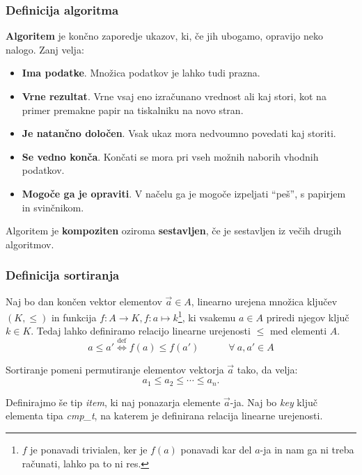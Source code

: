 \documentclass[a4paper,oneside,12pt]{article}
\begin{document}
\subsubsection{Definicija algoritma}

\textbf{Algoritem} je končno zaporedje ukazov, ki, če jih ubogamo, opravijo neko nalogo.
Zanj velja:
\begin{itemize}
  \item \textbf{Ima podatke}. Množica podatkov je lahko tudi prazna.
  \item \textbf{Vrne rezultat}. Vrne vsaj eno izračunano vrednost ali kaj stori, kot na primer
    premakne papir na tiskalniku na novo stran.
  \item \textbf{Je natančno določen}. Vsak ukaz mora nedvoumno povedati kaj storiti.
  \item \textbf{Se vedno konča}. Končati se mora pri vseh možnih naborih vhodnih podatkov.
  \item \textbf{Mogoče ga je opraviti}. V načelu ga je mogoče izpeljati ``peš'', s papirjem in
    svinčnikom.
\end{itemize}

\begin{definicija}
  Algoritem je \textbf{kompoziten} oziroma \textbf{sestavljen}, če je sestavljen iz večih
  drugih algoritmov.
\end{definicija}


\subsubsection{Definicija sortiranja}
\label{chapter:sortdef}
Naj bo dan končen vektor elementov $\vec{a} \in A$, linearno urejena množica ključev $(K,
\leq)$ in funkcija $f\!\!: A \rightarrow K, f\!\!: a \mapsto k$\footnote{
$f$ je ponavadi trivialen, ker je $f(a)$ ponavadi kar del
$a$-ja in nam ga ni treba računati, lahko pa to ni res.}, ki vsakemu $a \in A$ priredi
njegov ključ $k \in K$.
Tedaj lahko definiramo relacijo linearne urejenosti $\leq$ med elementi $A$.
\[ a \leq a' \overset{\text{def}}{\Longleftrightarrow} f(a) \leq f(a') \hspace{3em} \forall\ a, a' \in A \]


Sortiranje pomeni permutiranje elementov vektorja $\vec{a}$ tako, da velja:
\[ a_1 \leq a_2 \leq \cdots \leq a_n.\]

Definirajmo še tip \emph{item}, ki naj ponazarja elemente $\vec{a}$-ja. Naj bo \emph{key}
ključ elementa tipa \emph{cmp\_t}, na katerem je definirana relacija linearne urejenosti.
\end{document}
